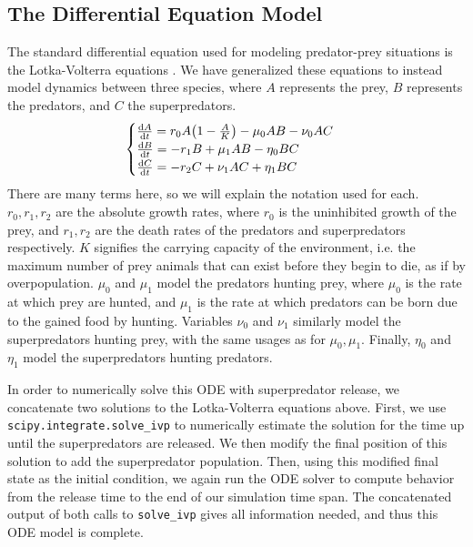 \documentclass[journal]{IEEEtran}
\begin{document}
\subsection{The Differential Equation Model}
The standard differential equation used for modeling predator-prey situations is the Lotka-Volterra equations \cite{meiss_textbook}. We have generalized these equations to instead model dynamics between three species, where $A$ represents the prey, $B$ represents the predators, and $C$ the superpredators.
$$\begin{cases}
    \dv{A}{t} = r_0A\qty(1-\frac{A}{K}) - \mu_0AB - \nu_0AC\\
    \dv{B}{t} = -r_1B + \mu_1AB - \eta_0BC\\
    \dv{C}{t} = -r_2C + \nu_1AC + \eta_1BC
\end{cases}$$
There are many terms here, so we will explain the notation used for each. $r_0,r_1,r_2$ are the absolute growth rates, where $r_0$ is the uninhibited growth of the prey, and $r_1,r_2$ are the death rates of the predators and superpredators respectively. $K$ signifies the carrying capacity of the environment, i.e. the maximum number of prey animals that can exist before they begin to die, as if by overpopulation. $\mu_0$ and $\mu_1$ model the predators hunting prey, where $\mu_0$ is the rate at which prey are hunted, and $\mu_1$ is the rate at which predators can be born due to the gained food by hunting. Variables $\nu_0$ and $\nu_1$ similarly model the superpredators hunting prey, with the same usages as for $\mu_0,\mu_1$. Finally, $\eta_0$ and $\eta_1$ model the superpredators hunting predators.\par
In order to numerically solve this ODE with superpredator release, we concatenate two solutions to the Lotka-Volterra equations above. First, we use \verb|scipy.integrate.solve_ivp| to numerically estimate the solution for the time up until the superpredators are released. We then modify the final position of this solution to add the superpredator population. Then, using this modified final state as the initial condition, we again run the ODE solver to compute behavior from the release time to the end of our simulation time span. The concatenated output of both calls to \verb|solve_ivp| gives all information needed, and thus this ODE model is complete.
\end{document}
